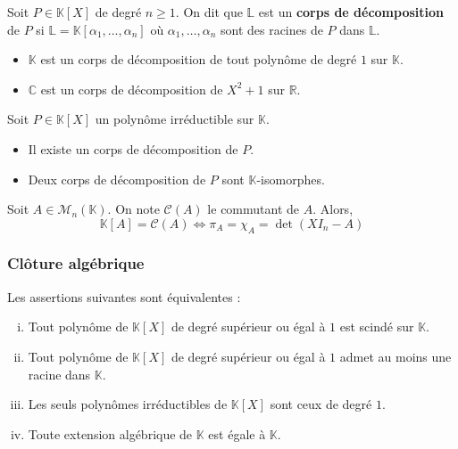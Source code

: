 	\begin{definition}
		Soit $P \in \mathbb{K}[X]$ de degré $n \geq 1$. On dit que $\mathbb{L}$ est un \textbf{corps de décomposition} de $P$ si $\mathbb{L} = \mathbb{K}[\alpha_1, \dots, \alpha_n]$ où $\alpha_1, \dots, \alpha_n$ sont des racines de $P$ dans $\mathbb{L}$.
	\end{definition}
	
	\begin{example}
		\begin{itemize}
			\item $\mathbb{K}$ est un corps de décomposition de tout polynôme de degré $1$ sur $\mathbb{K}$.
			\item $\mathbb{C}$ est un corps de décomposition de $X^2+1$ sur $\mathbb{R}$.
		\end{itemize}
	\end{example}
	
	\begin{theorem}
		Soit $P \in \mathbb{K}[X]$ un polynôme irréductible sur $\mathbb{K}$.
		\begin{itemize}
			\item Il existe un corps de décomposition de $P$.
			\item Deux corps de décomposition de $P$ sont $\mathbb{K}$-isomorphes.
		\end{itemize}
	\end{theorem}
	
	
	\begin{application}
		Soit $A \in \mathcal{M}_n(\mathbb{K})$. On note $\mathcal{C}(A)$ le commutant de $A$. Alors,
		\[ \mathbb{K}[A] = \mathcal{C}(A) \iff \pi_A = \chi_A = \det(XI_n - A) \]
	\end{application}
	
	\subsubsection{Clôture algébrique}
	
	
	\begin{proposition}
		\label{125-3}
		Les assertions suivantes sont équivalentes :
		\begin{enumerate}[(i)]
			\item Tout polynôme de $\mathbb{K}[X]$ de degré supérieur ou égal à $1$ est scindé sur $\mathbb{K}$.
			\item Tout polynôme de $\mathbb{K}[X]$ de degré supérieur ou égal à $1$ admet au moins une racine dans $\mathbb{K}$.
			\item Les seuls polynômes irréductibles de $\mathbb{K}[X]$ sont ceux de degré $1$.
			\item Toute extension algébrique de $\mathbb{K}$ est égale à $\mathbb{K}$.
		\end{enumerate}
	\end{proposition}
	

